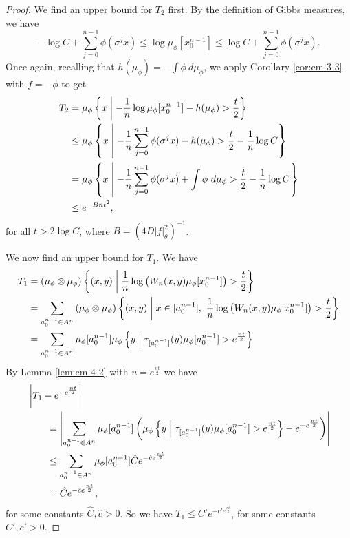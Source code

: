 \begin{theorem}
\begin{proof}
		We find an upper bound for $T_2$ first. By the definition of Gibbs measures, we have
		\begin{equation}\label{fml:gibbs-property}
			-\log{C} + \sum_{j = 0}^{n - 1}{\phi(\sigma^j{x})} \leq \log{\mu_\phi[x_0^{n - 1}]} \leq \log{C} + \sum_{j = 0}^{n - 1}{\phi(\sigma^j{x})}.
		\end{equation}
		Once again, recalling that $h(\mu_\phi) = -\int{\phi\ d\mu_\phi}$, we apply Corollary \ref{cor:cm-3-3} with $f = -\phi$ to get
		\begin{align*}
			T_2 &= \mu_\phi\left\{x \mathrel{}\middle|\mathrel{} - \frac{1}{n}\log{\mu_\phi[x_0^{n - 1}]} - h(\mu_\phi) > \frac{t}{2}\right\} \\
				&\leq \mu_\phi\left\{x \mathrel{}\middle|\mathrel{} -\frac{1}{n}\sum_{j = 0}^{n - 1}{\phi(\sigma^j{x})} -h(\mu_\phi) > \frac{t}{2} -\frac{1}{n}\log{C}\right\} \\
				&= \mu_\phi\left\{x \mathrel{}\middle|\mathrel{} -\frac{1}{n}\sum_{j = 0}^{n - 1}{\phi(\sigma^j{x})} + \int{\phi\ d\mu_\phi} > \frac{t}{2} -\frac{1}{n}\log{C}\right\} \\
				& \leq e^{-Bnt^2},
		\end{align*}
		for all $t > 2\log{C}$, where $B = (4D|f|_\theta^2)^{-1}$.
		
		We now find an upper bound for $T_1$. We have
		\begin{align*}
			T_1 &= (\mu_\phi \otimes \mu_\phi)\left\{(x, y) \midmid \frac{1}{n}\log\left(W_n(x, y) \mu_\phi[x_0^{n - 1}]\right) > \frac{t}{2}\right\} \\
				&= \sum_{a_0^{n - 1} \in A^n}{(\mu_\phi \otimes \mu_\phi)\left\{(x, y) \midmid x \in [a_0^{n - 1}],\ \frac{1}{n}\log\left(W_n(x, y) \mu_\phi[x_0^{n - 1}]\right) > \frac{t}{2}\right\}} \\
				&= \sum_{a_0^{n - 1} \in A^n}{\mu_\phi[a_0^{n - 1}] \mu_\phi\left\{y \midmid \tau_{[a_0^{n - 1}]}(y) \mu_\phi[a_0^{n - 1}] > e^\frac{nt}{2}\right\}}
		\end{align*}
		By Lemma \ref{lem:cm-4-2} with $u = e^\frac{nt}{2}$ we have
		\begin{align*}
			&\left|T_1 - e^{-e^\frac{nt}{2}}\right| \\
				& \qquad = \left|\sum_{a_0^{n - 1} \in A^n}\mu_\phi[a_0^{n - 1}]\left(\mu_\phi\left\{y \mathrel{}\middle|\mathrel{} \tau_{[a_0^{n - 1}]}(y) \mu_\phi[a_0^{n - 1}] > e^\frac{nt}{2}\right\} - e^{-e^\frac{nt}{2}}\right)\right| \\
				& \qquad \leq \sum_{a_0^{n - 1} \in A^n}\mu_\phi[a_0^{n - 1}] \hat{C}e^{-\hat{c}e^\frac{nt}{2}} \\
				& \qquad = \hat{C}e^{-\hat{c}e^\frac{nt}{2}},
		\end{align*}
		for some constants $\hat{C}, \hat{c} > 0$. So we have $T_1 \leq C'e^{-c'e^\frac{nt}{2}}$, for some constants $C', c' > 0$.
		

\end{proof}
\end{theorem}
